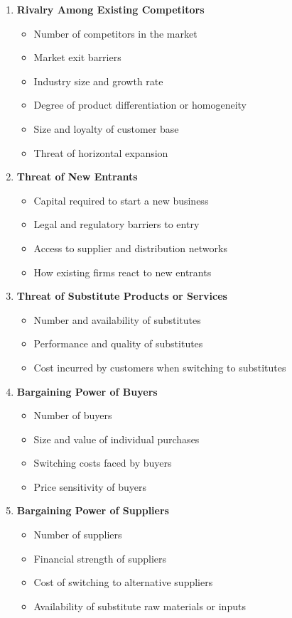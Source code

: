 \documentclass[12pt]{article}
\begin{document}
\begin{enumerate}
  \item \textbf{Rivalry Among Existing Competitors}
  \begin{itemize}
    \item Number of competitors in the market
    \item Market exit barriers
    \item Industry size and growth rate
    \item Degree of product differentiation or homogeneity
    \item Size and loyalty of customer base
    \item Threat of horizontal expansion
  \end{itemize}

  \item \textbf{Threat of New Entrants}
  \begin{itemize}
    \item Capital required to start a new business
    \item Legal and regulatory barriers to entry
    \item Access to supplier and distribution networks
    \item How existing firms react to new entrants
  \end{itemize}

  \item \textbf{Threat of Substitute Products or Services}
  \begin{itemize}
    \item Number and availability of substitutes
    \item Performance and quality of substitutes
    \item Cost incurred by customers when switching to substitutes
  \end{itemize}

  \item \textbf{Bargaining Power of Buyers}
  \begin{itemize}
    \item Number of buyers
    \item Size and value of individual purchases
    \item Switching costs faced by buyers
    \item Price sensitivity of buyers
  \end{itemize}

  \item \textbf{Bargaining Power of Suppliers}
  \begin{itemize}
    \item Number of suppliers
    \item Financial strength of suppliers
    \item Cost of switching to alternative suppliers
    \item Availability of substitute raw materials or inputs
  \end{itemize}
\end{enumerate}
\end{document}
